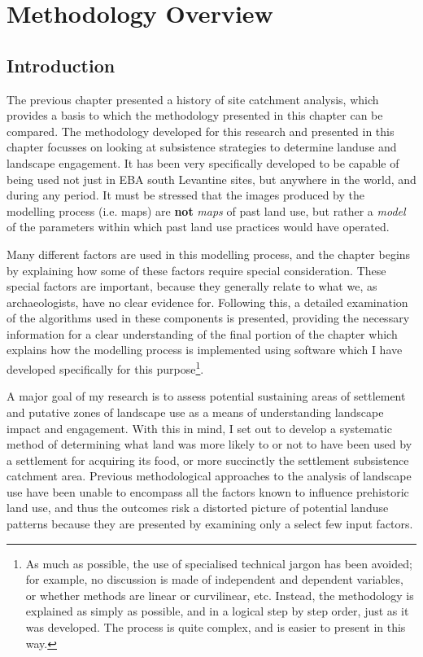  
\chapter{Methodology Overview}
\label{cha:methodology_overview}
\section{Introduction}


The previous chapter presented a history of site catchment analysis, which provides a basis to which the methodology presented in this chapter can be compared.  The methodology developed for this research and presented in this chapter focusses on looking at subsistence strategies to determine landuse and landscape engagement.  It has been very specifically developed to be capable of being used not just in EBA south Levantine sites, but anywhere in the world, and during any period.  It must be stressed that the images produced by the modelling process (i.e. maps) are \textbf{not} \emph{maps} of past land use, but rather a \emph{model} of the parameters within which past land use practices would have operated.


 Many different factors are used in this modelling process, and the chapter begins by explaining how some of these factors require special consideration. These special factors are important, because they generally relate to what we, as archaeologists, have no clear evidence for. Following this, a detailed examination of the algorithms used in these components is presented, providing the necessary information for a clear understanding of the final portion of the chapter which explains how the modelling process is implemented using software which I have developed specifically for this purpose\footnote{As much as possible, the use of specialised technical jargon has been avoided; for example, no discussion is made of independent and dependent variables, or whether methods are linear or curvilinear, etc.  Instead, the methodology is explained as simply as possible, and in a logical step by step order, just as it was developed.  The process is quite complex, and is easier to present in this way.}.

A major goal of my research is to assess potential sustaining areas of settlement and putative zones of landscape use as a means of understanding landscape impact and engagement. 
With this in mind, I set out to develop a systematic method of determining what land was more likely to or not to have been used by a settlement for acquiring its food, or more succinctly the settlement subsistence catchment area.  
Previous methodological approaches to the analysis of landscape use have been unable to encompass all the factors known to influence prehistoric land use, and thus the outcomes risk a distorted picture of potential landuse patterns because they are presented by examining only a select few input factors.  

